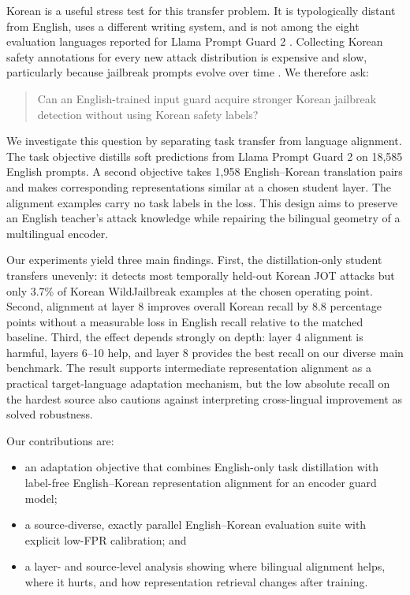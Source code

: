 \documentclass[10pt,twocolumn]{article}
\begin{document}
Korean is a useful stress test for this transfer problem. It is typologically
distant from English, uses a different writing system, and is not among the
eight evaluation languages reported for Llama Prompt Guard 2
\cite{meta2025promptguard2}. Collecting Korean safety annotations for every new
attack distribution is expensive and slow, particularly because jailbreak
prompts evolve over time \cite{piet2025jot}. We therefore ask:

\begin{quote}
Can an English-trained input guard acquire stronger Korean jailbreak detection
without using Korean safety labels?
\end{quote}

We investigate this question by separating task transfer from language
alignment. The task objective distills soft predictions from Llama Prompt Guard
2 on 18,585 English prompts. A second objective takes 1,958 English--Korean
translation pairs and makes corresponding representations similar at a chosen
student layer. The alignment examples carry no task labels in the loss. This
design aims to preserve an English teacher's attack knowledge while repairing
the bilingual geometry of a multilingual encoder.

Our experiments yield three main findings. First, the distillation-only student
transfers unevenly: it detects most temporally held-out Korean JOT attacks but
only 3.7\% of Korean WildJailbreak examples at the chosen operating point.
Second, alignment at layer 8 improves overall Korean recall by 8.8 percentage
points without a measurable loss in English recall relative to the matched
baseline. Third, the effect depends strongly on depth: layer 4 alignment is
harmful, layers 6--10 help, and layer 8 provides the best recall on our diverse
main benchmark. The result supports intermediate representation alignment as a
practical target-language adaptation mechanism, but the low absolute recall on
the hardest source also cautions against interpreting cross-lingual improvement
as solved robustness.

Our contributions are:
\begin{itemize}
    \item an adaptation objective that combines English-only task distillation
    with label-free English--Korean representation alignment for an encoder
    guard model;
    \item a source-diverse, exactly parallel English--Korean evaluation suite
    with explicit low-FPR calibration; and
    \item a layer- and source-level analysis showing where bilingual alignment
    helps, where it hurts, and how representation retrieval changes after
    training.
\end{itemize}
\end{document}
